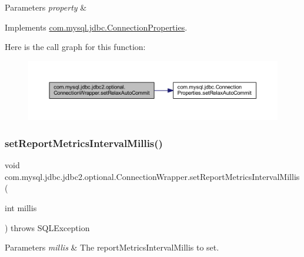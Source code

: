 \begin{DoxyParams}{Parameters}
{\em property} & \\
\hline
\end{DoxyParams}


Implements \mbox{\hyperlink{interfacecom_1_1mysql_1_1jdbc_1_1_connection_properties_a2b1a30e309c80866f41d0bc85d16e958}{com.\+mysql.\+jdbc.\+Connection\+Properties}}.

Here is the call graph for this function\+:
\nopagebreak
\begin{figure}[H]
\begin{center}
\leavevmode
\includegraphics[width=350pt]{classcom_1_1mysql_1_1jdbc_1_1jdbc2_1_1optional_1_1_connection_wrapper_af338a10a5b9e993703c9e21810e74b21_cgraph}
\end{center}
\end{figure}
\mbox{\label{classcom_1_1mysql_1_1jdbc_1_1jdbc2_1_1optional_1_1_connection_wrapper_ac30ff270089a0b4903332b4b6e3b2f2d}} 
\subsubsection{\texorpdfstring{set\+Report\+Metrics\+Interval\+Millis()}{setReportMetricsIntervalMillis()}}
{\footnotesize\ttfamily void com.\+mysql.\+jdbc.\+jdbc2.\+optional.\+Connection\+Wrapper.\+set\+Report\+Metrics\+Interval\+Millis (\begin{DoxyParamCaption}\item[{int}]{millis }\end{DoxyParamCaption}) throws S\+Q\+L\+Exception}


\begin{DoxyParams}{Parameters}
{\em millis} & The report\+Metrics\+Interval\+Millis to set. \\
\hline
\end{DoxyParams}

